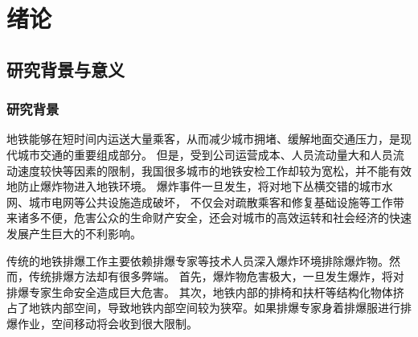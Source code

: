 \chapter{绪论}

\section{研究背景与意义}


\subsection{研究背景}
地铁能够在短时间内运送大量乘客，从而减少城市拥堵、缓解地面交通压力，是现代城市交通的重要组成部分。
但是，受到公司运营成本、人员流动量大和人员流动速度较快等因素的限制，我国很多城市的地铁安检工作却较为宽松，并不能有效地防止爆炸物进入地铁环境。
爆炸事件一旦发生，将对地下丛横交错的城市水网、城市电网等公共设施造成破坏，
不仅会对疏散乘客和修复基础设施等工作带来诸多不便，危害公众的生命财产安全，还会对城市的高效运转和社会经济的快速发展产生巨大的不利影响。

传统的地铁排爆工作主要依赖排爆专家等技术人员深入爆炸环境排除爆炸物。然而，传统排爆方法却有很多弊端。
首先，爆炸物危害极大，一旦发生爆炸，将对排爆专家生命安全造成巨大危害。
其次，地铁内部的排椅和扶杆等结构化物体挤占了地铁内部空间，导致地铁内部空间较为狭窄。如果排爆专家身着排爆服进行排爆作业，空间移动将会收到很大限制。

